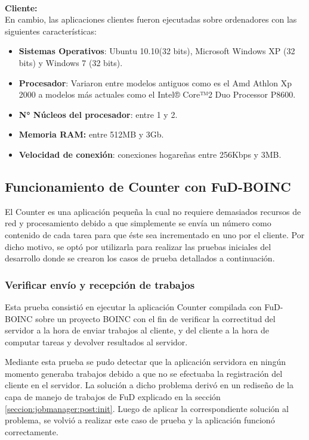 \textbf{\\Cliente:}\\

En cambio, las aplicaciones clientes fueron ejecutadas sobre ordenadores con las siguientes características:

\begin{itemize}
 \item \textbf{Sistemas Operativos}: Ubuntu 10.10(32 bits), Microsoft Windows XP (32 bits) y Windows 7 (32 bits).
 \item \textbf{Procesador}: Variaron entre modelos antiguos como es el Amd Athlon Xp 2000 a modelos más actuales como el Intel® Core™2 Duo Processor P8600.
 \item \textbf{N° Núcleos del procesador}: entre 1 y 2.
 \item \textbf{Memoria RAM:} entre 512MB y 3Gb.
 \item \textbf{Velocidad de conexión}: conexiones hogareñas entre 256Kbps y 3MB.
\end{itemize}


\subsection{Funcionamiento de Counter con FuD-BOINC}

El Counter es una aplicación pequeña la cual no requiere demasiados recursos de red y procesamiento debido a que simplemente se envía un número como contenido de cada tarea para que éste sea incrementado en uno por el cliente. Por dicho motivo, se optó por utilizarla para realizar las pruebas iniciales del desarrollo donde se crearon los casos de prueba detallados a continuación.

\subsubsection{Verificar envío y recepción de trabajos}
Esta prueba consistió en ejecutar la aplicación Counter compilada con FuD-BOINC sobre un proyecto BOINC con el fin de verificar la correctitud del servidor a la hora de enviar trabajos al cliente, y del cliente a la hora de computar tareas y devolver resultados al servidor.

Mediante esta prueba se pudo detectar que la aplicación servidora en ningún momento generaba trabajos debido a que no se efectuaba la registración del cliente en el servidor. La solución a dicho problema derivó en un rediseño de la capa de manejo de trabajos de FuD explicado en la sección \ref{seccion:jobmanager:post:init}. Luego de aplicar la correspondiente solución al problema, se volvió a realizar este caso de prueba y la aplicación funcionó correctamente.

